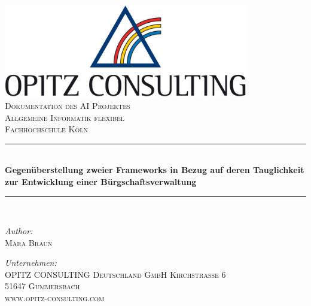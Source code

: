 \begin{titlepage}
\begin{center}

\includegraphics[width=0.80\textwidth]{img/oc-logo.jpg}\\[1cm]

\textsc{\LARGE Dokumentation des AI Projektes}\\[1.5cm]

\textsc{\Large Allgemeine Informatik flexibel}\\[0.5cm]
\textsc{\Large Fachhochschule Köln}\\[0.5cm]

\newcommand{\HRule}{\rule{\linewidth}{0.5mm}}
\HRule \\[0.4cm]
{ \huge \bfseries Gegenüberstellung zweier Frameworks in Bezug auf deren Tauglichkeit zur Entwicklung einer Bürgschaftsverwaltung}\\[0.4cm]
\HRule \\[1.5cm]

\begin{minipage}{0.3\textwidth}
\begin{flushleft} \large
\emph{Author:}\\
\textsc{Mara Braun}
\end{flushleft}
\end{minipage}
\hfill
\begin{minipage}{0.6\textwidth}
\begin{flushright} \large
\emph{Unternehmen:} \\
\textsc{OPITZ CONSULTING Deutschland GmbH
Kirchstraße 6\\
51647 Gummersbach\\
www.opitz-consulting.com}
\end{flushright}
\end{minipage}

\vfill
\end{center}
\end{titlepage}
